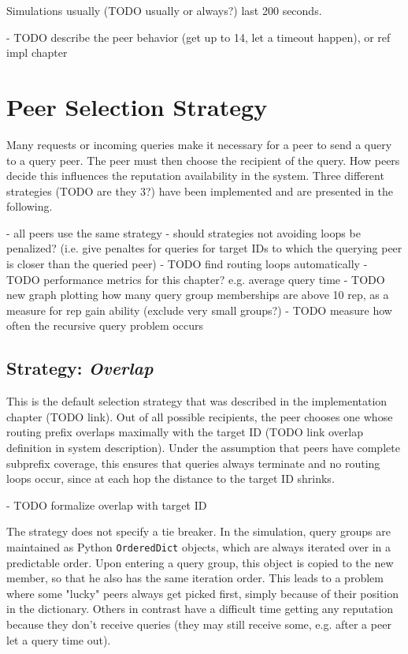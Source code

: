 Simulations usually (TODO usually or always?) last 200 seconds.

- TODO describe the peer behavior (get up to 14, let a timeout happen), or ref
  impl chapter

\section{Peer Selection Strategy}
\label{sec:selection}
Many requests or incoming queries make it necessary for a peer to send a query
to a query peer. The peer must then choose the recipient of the query. How peers
decide this influences the reputation availability in the system. Three
different strategies (TODO are they 3?) have been implemented and are presented
in the following.

- all peers use the same strategy
- should strategies not avoiding loops be penalized? (i.e. give penaltes for
  queries for target IDs to which the querying peer is closer than the queried
  peer)
- TODO find routing loops automatically
- TODO performance metrics for this chapter? e.g. average query time
- TODO new graph plotting how many query group memberships are above 10 rep, as
  a measure for rep gain ability (exclude very small groups?)
- TODO measure how often the recursive query problem occurs

\subsection{Strategy: \emph{Overlap}}
\label{sec:rep_avail_selection_overlap}
This is the default selection strategy that was described in the implementation
chapter (TODO link). Out of all possible recipients, the peer chooses one whose
routing prefix overlaps maximally with the target ID (TODO link overlap
definition in system description). Under the assumption that peers have complete
subprefix coverage, this ensures that queries always terminate and no routing
loops occur, since at each hop the distance to the target ID shrinks.

- TODO formalize overlap with target ID

The strategy does not specify a tie breaker. In the simulation, query groups are
maintained as Python \texttt{OrderedDict} objects, which are always iterated
over in a predictable order. Upon entering a query group, this object is copied
to the new member, so that he also has the same iteration order. This leads to a
problem where some "lucky" peers always get picked first, simply because of
their position in the dictionary. Others in contrast have a difficult time
getting any reputation because they don't receive queries (they may still
receive some, e.g. after a peer let a query time out).

